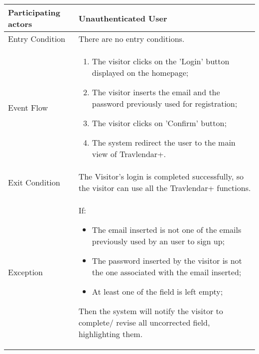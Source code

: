 \begin{table}[H]
	\begin{center}
		\begin{tabular}{ | p{} | p{} | }
		\hline
		Participating actors & Unauthenticated User\\
		\hline
		Entry Condition & There are no entry conditions.\\
		\hline
		Event Flow & 
			\begin{enumerate}
				\item The visitor clicks on the 'Login' button displayed on the homepage;
				\item The visitor inserts the email and the password previously used for registration;
				\item The visitor clicks on 'Confirm' button;
				\item The system redirect the user to the main view of Travlendar+.
			\end{enumerate} \\
		\hline
		Exit Condition & The Visitor’s login is completed successfully, so the visitor can use all the Travlendar+ functions. \\
		\hline
		Exception & If:
				\begin{itemize}
   					\item The email inserted is not one of the emails previously used by an user to sign up;
   					\item The password inserted by the visitor is not the one associated with the email inserted;
   					\item At least one of the field is left empty;
   				\end{itemize}
   		Then the system will notify the visitor to complete/ revise all uncorrected field, highlighting them.\\ 
		\hline
		\end{tabular}
	\end{center}
\end{table}